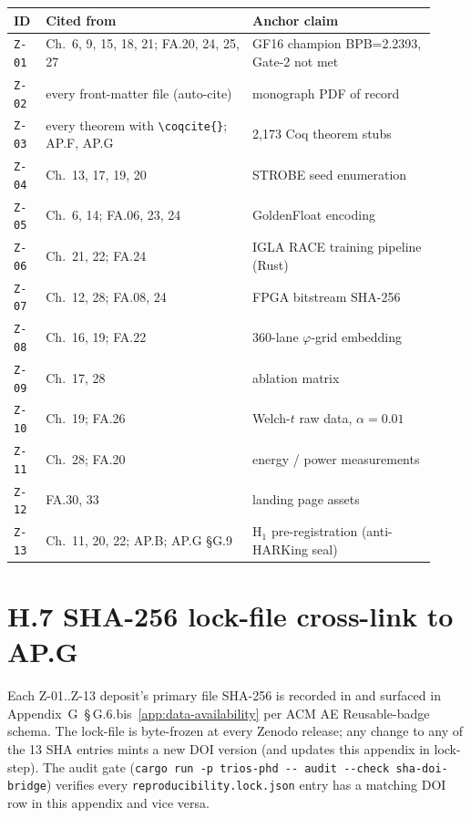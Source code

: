 \begin{small}
\begin{longtable}{@{}p{0.07\linewidth}p{0.45\linewidth}p{0.40\linewidth}@{}}
\toprule
\textbf{ID} & \textbf{Cited from} & \textbf{Anchor claim} \\
\midrule
\endhead
\texttt{Z-01} & Ch.~6, 9, 15, 18, 21; FA.20, 24, 25, 27 & GF16 champion BPB=2.2393, Gate-2 not met \\
\texttt{Z-02} & every front-matter file (auto-cite)      & monograph PDF of record \\
\texttt{Z-03} & every theorem with \texttt{\textbackslash coqcite\{\}}; AP.F, AP.G    & 2{,}173 Coq theorem stubs \\
\texttt{Z-04} & Ch.~13, 17, 19, 20                     & STROBE seed enumeration \\
\texttt{Z-05} & Ch.~6, 14; FA.06, 23, 24                 & GoldenFloat encoding \\
\texttt{Z-06} & Ch.~21, 22; FA.24                        & IGLA RACE training pipeline (Rust) \\
\texttt{Z-07} & Ch.~12, 28; FA.08, 24                    & FPGA bitstream SHA-256 \\
\texttt{Z-08} & Ch.~16, 19; FA.22                        & 360-lane $\varphi$-grid embedding \\
\texttt{Z-09} & Ch.~17, 28                                & ablation matrix \\
\texttt{Z-10} & Ch.~19; FA.26                             & Welch-$t$ raw data, $\alpha=0.01$ \\
\texttt{Z-11} & Ch.~28; FA.20                             & energy / power measurements \\
\texttt{Z-12} & FA.30, 33                                  & landing page assets \\
\texttt{Z-13} & Ch.~11, 20, 22; AP.B; AP.G \S G.9      & H$_1$ pre-registration (anti-HARKing seal) \\
\bottomrule
\end{longtable}
\end{small}

\section*{H.7 SHA-256 lock-file cross-link to AP.G}

\noindent Each Z-01..Z-13 deposit's primary file SHA-256 is recorded in
 and surfaced in
Appendix~G~\S\,G.6.bis~\ref{app:data-availability} per ACM AE Reusable-badge
schema. The lock-file is byte-frozen at every Zenodo release; any change to
any of the 13 SHA entries mints a new DOI version (and updates this appendix
in lock-step). The audit gate
(\texttt{cargo run -p trios-phd -{}-{} audit -{}-{}check sha-doi-bridge})
verifies every \texttt{reproducibility.lock.json} entry has a matching DOI
row in this appendix and vice versa.

